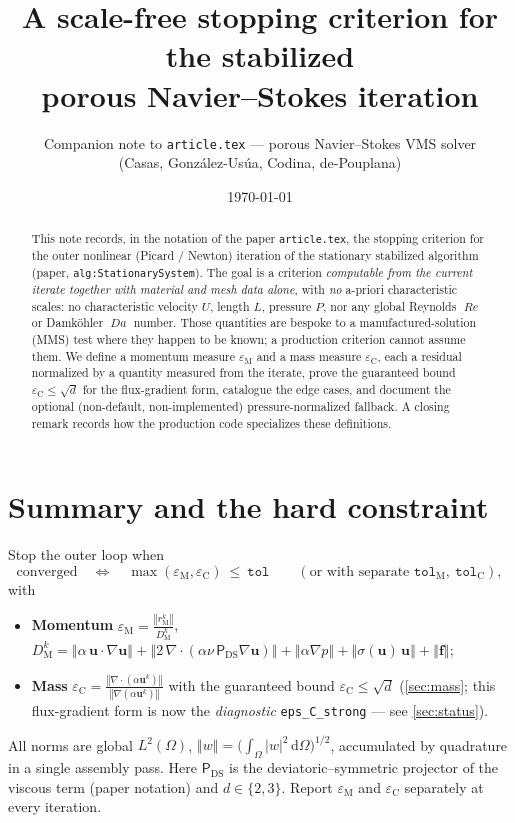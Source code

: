 \documentclass[11pt]{article}
\title{A scale-free stopping criterion for the stabilized\\
porous Navier--Stokes iteration}
\author{Companion note to \texttt{article.tex} --- porous Navier--Stokes VMS solver\\
\small (Casas, Gonz\'alez-Us\'ua, Codina, de-Pouplana)}
\date{\today}
\newcommand{\Reyn}{\operatorname{\mathit{Re}}}
\newcommand{\Damk}{\operatorname{\mathit{Da}}}
\newcommand{\DSPi}{\mathsf{P}_{\mathrm{DS}}}  %
\newcommand{\bu}{\boldsymbol{u}}
\newcommand{\bef}{\boldsymbol{f}}
\newcommand{\grad}{\nabla}
\newcommand{\divg}{\nabla\!\cdot\!}
\newcommand{\dd}{\,\mathrm{d}}
\newcommand{\norm}[1]{\left\Vert #1\right\Vert}
\newcommand{\rM}{r_{\mathrm M}}
\newcommand{\DM}{D_{\mathrm M}}
\newcommand{\epsM}{\varepsilon_{\mathrm M}}
\newcommand{\epsC}{\varepsilon_{\mathrm C}}
\theoremstyle{plain}
\theoremstyle{remark}
\begin{document}
\maketitle

\begin{abstract}
This note records, in the notation of the paper \texttt{article.tex}, the
stopping criterion for the outer nonlinear (Picard / Newton) iteration of the
stationary stabilized algorithm (paper, \texttt{alg:StationarySystem}). The goal
is a criterion \emph{computable from the current iterate together with material
and mesh data alone}, with \emph{no} a-priori characteristic scales: no
characteristic velocity $U$, length $L$, pressure $P$, nor any global Reynolds
$\Reyn$ or Damk\"ohler $\Damk$ number. Those quantities are bespoke to a
manufactured-solution (MMS) test where they happen to be known; a production
criterion cannot assume them. We define a momentum measure $\epsM$ and a mass
measure $\epsC$, each a residual normalized by a quantity measured from the
iterate, prove the guaranteed bound $\epsC\le\sqrt{d}$ for the flux-gradient
form, catalogue the edge cases, and document the optional (non-default,
non-implemented) pressure-normalized fallback. A closing remark records how the
production code specializes these definitions.
\end{abstract}

\section{Summary and the hard constraint}\label{sec:summary}
Stop the outer loop when
\begin{equation}\label{eq:gate}
  \text{converged}\quad\Longleftrightarrow\quad
  \max(\epsM,\epsC)\ \le\ \texttt{tol}
  \qquad(\text{or with separate }\texttt{tol}_{\mathrm M},\ \texttt{tol}_{\mathrm C}),
\end{equation}
with
\begin{itemize}
  \item \textbf{Momentum} $\displaystyle \epsM=\frac{\norm{\rM^k}}{\DM^k}$,
    \quad
    $\DM^k=\norm{\alpha\,\bu\!\cdot\!\grad\bu}
      +\norm{2\,\divg(\alpha\nu\,\DSPi\grad\bu)}
      +\norm{\alpha\grad p}
      +\norm{\sigma(\bu)\,\bu}
      +\norm{\bef}$;
  \item \textbf{Mass} $\displaystyle
    \epsC=\frac{\norm{\divg(\alpha\bu^k)}}{\norm{\grad(\alpha\bu^k)}}$
    with the guaranteed bound $\epsC\le\sqrt{d}$
    (\cref{sec:mass}; this flux-gradient form is now the \emph{diagnostic}
    \texttt{eps\_C\_strong} --- see \cref{sec:status}).
\end{itemize}
All norms are global $L^2(\Omega)$, $\norm{w}=\big(\int_\Omega|w|^2\dd\Omega\big)^{1/2}$,
accumulated by quadrature in a single assembly pass. Here $\DSPi$ is the
deviatoric--symmetric projector of the viscous term (paper notation) and
$d\in\{2,3\}$. Report $\epsM$ and $\epsC$ separately at every iteration.
\end{document}
